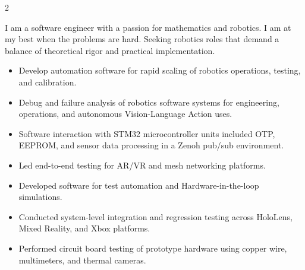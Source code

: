 \documentclass[10pt,a4paper,withhyper]{altacv}
\begin{document}


\makecvheader


\begin{paracol}{2}


I am a software engineer with a passion for mathematics and robotics.
I am at my best when the problems are hard. Seeking robotics roles that demand a balance of theoretical rigor and practical implementation.


\begin{itemize}
\item Develop automation software for rapid scaling of robotics operations, testing, and calibration.
\item Debug and failure analysis of robotics software systems for engineering, operations, and autonomous Vision-Language Action uses.
\item Software interaction with STM32 microcontroller units included OTP, EEPROM, and sensor data processing in a Zenoh pub/sub environment.
\end{itemize}

\divider

\begin{itemize}
\item Led end-to-end testing for AR/VR and mesh networking platforms.
\item Developed software for test automation and Hardware-in-the-loop simulations.
\end{itemize}

\divider

\begin{itemize}
\item Conducted system-level integration and regression testing across HoloLens, Mixed Reality, and Xbox platforms.
\item Performed circuit board testing of prototype hardware using copper wire, multimeters, and thermal cameras.
\end{itemize}


\end{paracol}
\end{document}
